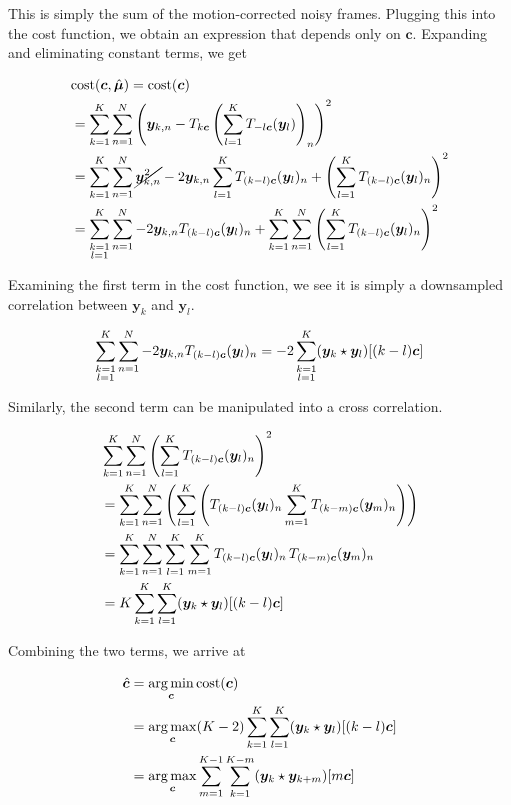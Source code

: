 \documentclass{article}
\newcommand\lstar{\mkern4mu{\star}\mkern4mu}
\DeclareMathOperator*{\argmin}{\arg\min}
\DeclareMathOperator*{\argmax}{\arg\max}
\begin{document}
This is simply the sum of the motion-corrected noisy frames.  Plugging this into the cost function, we obtain an expression that depends only on $\bm{c}$.  Expanding and eliminating constant terms, we get

\begin{align*}
  &\text{cost}(\bm{c}, \hat{\bm{\mu}}) = \text{cost}(\bm{c}) \\
  &=\sum_{k=1}^K \sum_{n=1}^N \left(\bm{y}_{k,n} - T_{k\bm{c}}\left(\sum_{l=1}^K T_{-l\bm{c}}(\bm{y}_l)\right)_n\right)^2 \\
  &=\sum_{k=1}^K \sum_{n=1}^N \cancel{\bm{y}_{k,n}^2} -2\bm{y}_{k,n}\sum_{l=1}^K T_{(k-l)\bm{c}}(\bm{y}_l)_n + \left(\sum_{l=1}^K T_{(k-l)\bm{c}}(\bm{y}_l)_n\right)^2 \\
  &=\sum_{\substack{k=1 \\ l=1}}^K \sum_{n=1}^N -2\bm{y}_{k,n} T_{(k-l)\bm{c}}(\bm{y}_l)_n +
  \sum_{k=1}^K \sum_{n=1}^N \left(\sum_{l=1}^K T_{(k-l)\bm{c}}(\bm{y}_l)_n\right)^2 \\
\end{align*}

Examining the first term in the cost function, we see it is simply a downsampled correlation between $\bm{y}_k$ and $\bm{y}_l$.

$$\sum_{\substack{k=1 \\ l=1}}^K \sum_{n=1}^N -2\bm{y}_{k,n} T_{(k-l)\bm{c}}(\bm{y}_l)_n = -2\sum_{\substack{k=1 \\ l=1}}^K (\bm{y}_k \lstar \bm{y}_l) [(k-l)\bm{c}]$$

Similarly, the second term can be manipulated into a cross correlation.

\begin{align*}
  &\sum_{k=1}^K \sum_{n=1}^N \left(\sum_{l=1}^K T_{(k-l)\bm{c}}(\bm{y}_l)_n\right)^2 \\
  &= \sum_{k=1}^K \sum_{n=1}^N \left(\sum_{l=1}^K \left( T_{(k-l)\bm{c}}(\bm{y}_l)_n \sum_{m=1}^K T_{(k-m)\bm{c}}(\bm{y}_m)_n \right)\right) \\
  &= \sum_{k=1}^K \sum_{n=1}^N \sum_{l=1}^K \sum_{m=1}^K T_{(k-l)\bm{c}}(\bm{y}_l)_n\, T_{(k-m)\bm{c}}(\bm{y}_m)_n \\
  &= K \sum_{k=1}^K \sum_{l=1}^K (\bm{y}_k \lstar \bm{y}_l)[(k-l)\bm{c}]
\end{align*}

Combining the two terms, we arrive at

\begin{align*}
  \hat{\bm{c}} &= \argmin_{\bm{c}} \text{cost}(\bm{c}) \\
  &= \argmax_{\bm{c}} (K - 2) \sum_{k=1}^K \sum_{l=1}^K (\bm{y}_k \lstar \bm{y}_l)[(k - l)\bm{c}] \\
  &= \argmax_{\bm{c}} \sum_{m=1}^{K-1} \sum_{k=1}^{K-m} (\bm{y}_k \lstar \bm{y}_{k+m})[m\bm{c}]
\end{align*}
\end{document}
